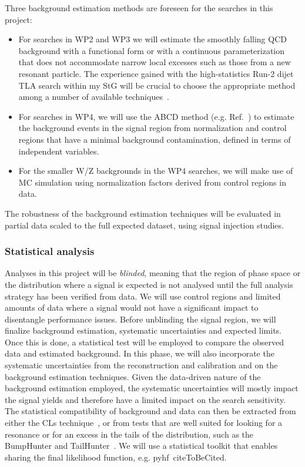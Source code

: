 Three background estimation methods are foreseen for the searches in this project: 
\begin{itemize}
\item For searches in WP2 and WP3 we will estimate the smoothly falling QCD background with a functional form or with a continuous parameterization that does not accommodate narrow local excesses such as those from a new resonant particle. The experience gained with the high-statistics Run-2 dijet TLA search within my StG will be crucial to choose the appropriate method among a number of available techniques~\cite{ToBeCited}. %
\item For searches in WP4, we will use the ABCD method (e.g. Ref.~\cite{ToBeCited}) %
to estimate the background events in the signal region from normalization and control regions that have a minimal background contamination, defined in terms of independent variables. 
\item For the smaller W/Z backgrounds in the WP4 searches, we will make use of MC simulation using normalization factors derived from control regions in data. 
\end{itemize}
The robustness of the background estimation techniques will be evaluated in partial data scaled to the full expected dataset, using signal injection studies. 


\subsubsection{Statistical analysis} Analyses in this project will be \textit{blinded}, meaning that the region of phase space or the distribution where a signal is expected is not analysed until the full analysis strategy has been verified from data. We will use control regions and limited amounts of data where a signal would not have a significant impact to disentangle performance issues. 
Before unblinding the signal region, we will finalize background estimation, systematic uncertainties and expected limits. 
Once this is done, a statistical test will be employed to compare the observed data and estimated background. In this phase, we will also incorporate the systematic uncertainties from the reconstruction and calibration and on the background estimation techniques. 
Given the data-driven nature of the background estimation employed, the systematic uncertainties will mostly impact the signal yields and therefore have a limited impact on the search sensitivity. 
The statistical compatibility of background and data can then be extracted from either the CLs technique~\cite{ToBeCited}, %
or from tests that are well suited for looking for a resonance or for an excess in the tails of the distribution, such as the BumpHunter and TailHunter~\cite{ToBeCited}. %
We will use a statistical toolkit that enables sharing the final likelihood function, e.g. pyhf~cite{ToBeCited}. %

